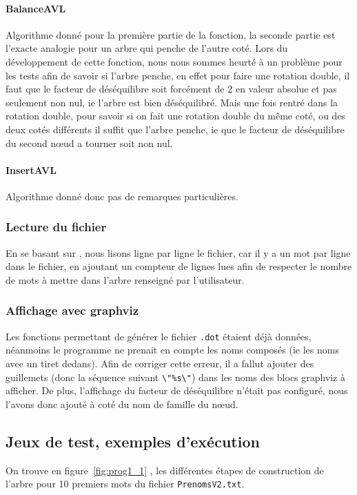 \documentclass{article} %
\begin{document}
\paragraph{BalanceAVL} Algorithme donné pour la première partie de la fonction, la seconde partie est l'exacte analogie pour un arbre qui penche de l'autre coté. Lors du développement de cette fonction, nous nous sommes heurté à un problème pour les tests afin de savoir si l'arbre penche, en effet pour faire une rotation double, il faut que le facteur de déséquilibre soit forcément de 2 en valeur absolue et pas seulement non nul, ie l'arbre est bien déséquilibré. Mais une fois rentré dans la rotation double, pour savoir si on fait une rotation double du même coté, ou des deux cotés différents il suffit que l'arbre penche, ie que le facteur de déséquilibre du second nœud a tourner soit non nul. 

\paragraph{InsertAVL} Algorithme donné donc pas de remarques particulières.

\subsubsection{Lecture du fichier}
En se basant sur \cite{lect_lines}, nous lisons ligne par ligne le fichier, car il y a un mot par ligne dans le fichier, en ajoutant un compteur de lignes lues afin de respecter le nombre de mots à mettre dans l'arbre renseigné par l'utilisateur.  

\subsubsection{Affichage avec graphviz}
Les fonctions permettant de générer le fichier \texttt{.dot} étaient déjà données, néanmoins le programme ne prenait en compte les noms composés (ie les noms avec un tiret dedans). Afin de corriger cette erreur, il a fallut ajouter des guillemets (donc la séquence suivant \texttt{\textbackslash "\%s\textbackslash "}) dans les noms des blocs graphviz à afficher. De plus, l'affichage du facteur de déséquilibre n'était pas configuré, nous l'avons donc ajouté à coté du nom de famille du nœud.


\subsection{Jeux de test, exemples d'exécution}
On trouve en figure~\ref{fig:prog1_1} , les différentes étapes de construction de l'arbre pour 10 premiers mots du fichier \texttt{PrenomsV2.txt}. 
\end{document}
